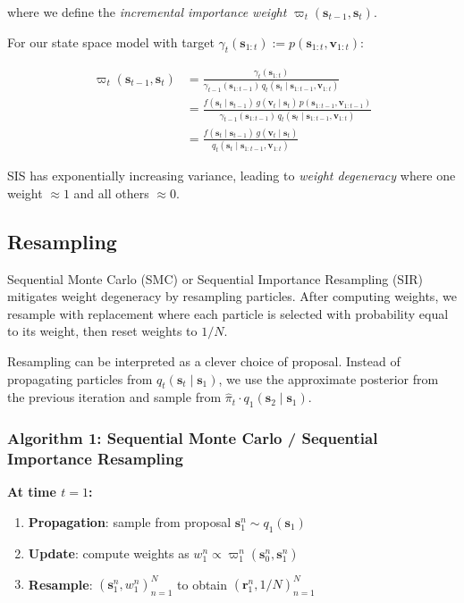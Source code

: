 \documentclass[11pt,a4paper]{article}
\begin{document}
where we define the \textit{incremental importance weight} $\varpi_t(\mathbf{s}_{t-1}, \mathbf{s}_t)$.

For our state space model with target $\gamma_t(\mathbf{s}_{1:t}) := p(\mathbf{s}_{1:t}, \mathbf{v}_{1:t})$:

\begin{align}
\varpi_t(\mathbf{s}_{t-1}, \mathbf{s}_t) &= \frac{\gamma_t(\mathbf{s}_{1:t})}{\gamma_{t-1}(\mathbf{s}_{1:t-1}) \, q_t(\mathbf{s}_t \mid \mathbf{s}_{1:t-1}, \mathbf{v}_{1:t})} \nonumber \\
&= \frac{f(\mathbf{s}_t \mid \mathbf{s}_{t-1}) \, g(\mathbf{v}_t \mid \mathbf{s}_t) \, p(\mathbf{s}_{1:t-1}, \mathbf{v}_{1:t-1})}{\gamma_{t-1}(\mathbf{s}_{1:t-1}) \, q_t(\mathbf{s}_t \mid \mathbf{s}_{1:t-1}, \mathbf{v}_{1:t})} \nonumber \\
&= \frac{f(\mathbf{s}_t \mid \mathbf{s}_{t-1}) \, g(\mathbf{v}_t \mid \mathbf{s}_t)}{q_t(\mathbf{s}_t \mid \mathbf{s}_{1:t-1}, \mathbf{v}_{1:t})}
\label{eq:sis_ssm_weights}
\end{align}

SIS has exponentially increasing variance, leading to \textit{weight degeneracy} where one weight $\approx 1$ and all others $\approx 0$.

\subsection{Resampling}

Sequential Monte Carlo (SMC) or Sequential Importance Resampling (SIR) mitigates weight degeneracy by resampling particles. After computing weights, we resample with replacement where each particle is selected with probability equal to its weight, then reset weights to $1/N$.

Resampling can be interpreted as a clever choice of proposal. Instead of propagating particles from $q_{t}(\mathbf{s}_t \mid \mathbf{s}_1)$, we use the approximate posterior from the previous iteration and sample from $\widehat{\pi}_t \cdot q_1(\mathbf{s}_2 \mid \mathbf{s}_1)$.

\subsubsection*{Algorithm 1: Sequential Monte Carlo / Sequential Importance Resampling}

\textbf{At time $t=1$:}
\begin{enumerate}
\item \textbf{Propagation}: sample from proposal $\mathbf{s}_1^n \sim q_1(\mathbf{s}_1)$
\item \textbf{Update}: compute weights as $w_1^n \propto \varpi_1^n(\mathbf{s}_0^n, \mathbf{s}_1^n)$
\item \textbf{Resample}: $(\mathbf{s}_1^n, w_1^n)_{n=1}^N$ to obtain $(\mathbf{r}_1^n, 1/N)_{n=1}^N$
\end{enumerate}
\end{document}
